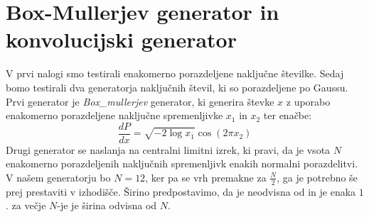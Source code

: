 \documentclass[slovene,11pt,a4paper]{article}
\numberwithin{equation}{section} %
\numberwithin{figure}{section} %
\numberwithin{table}{section} %
\begin{document}
\section{Box-Mullerjev generator in konvolucijski generator}
V prvi nalogi smo testirali enakomerno porazdeljene naključne številke. Sedaj bomo testirali dva generatorja naključnih števil, ki so porazdeljene po Gaussu. Prvi generator je \textit{Box_mullerjev} generator, ki generira števke $x$ z uporabo enakomerno porazdeljene naključne spremenljivke $x_1$ in $x_2$ ter enačbe:
\begin{equation}
\frac{dP}{dx} = \sqrt{-2 \log{x_1}} \cos(2 \pi x_2)
\end{equation}
Drugi generator se naslanja na centralni limitni izrek, ki pravi, da je vsota $N$ enakomerno porazdeljenih naključnih spremenljivk enakih normalni porazdelitvi. V našem generatorju bo $N=12$, ker pa se vrh premakne za $\frac{N}{2}$, ga je potrebno še prej prestaviti v izhodišče. Širino predpostavimo, da je neodvisna od in je enaka $1$. za večje $N$-je je širina odvisna od $N$.
\end{document}
